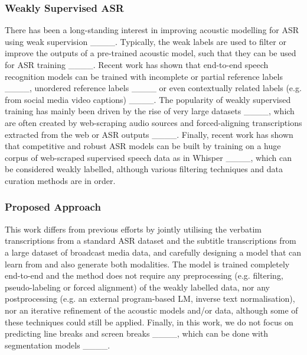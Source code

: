 \subsubsection{Weakly Supervised ASR}
\noindent There has been a long-standing interest in improving acoustic modelling for ASR using weak supervision ____. Typically, the weak labels are used to filter or improve the outputs of a pre-trained acoustic model, such that they can be used for ASR training ____. Recent work has shown that end-to-end speech recognition models can be trained with incomplete or partial reference labels ____, unordered reference labels ____ or even contextually related labels (e.g. from social media video captions) ____. The popularity of weakly supervised training has mainly been driven by the rise of very large datasets ____, which are often created by web-scraping audio sources and forced-aligning transcriptions extracted from the web or ASR outputs ____. Finally, recent work has shown that competitive and robust ASR models can be built by training on a huge corpus of web-scraped supervised speech data as in Whisper ____, which can be considered weakly labelled, although various filtering techniques and data curation methods are in order.

\subsubsection{Proposed Approach}
\noindent This work differs from previous efforts by jointly utilising the verbatim transcriptions from a standard ASR dataset and the subtitle transcriptions from a large dataset of broadcast media data, and carefully designing a model that can learn from and also generate both modalities. The model is trained completely end-to-end and the method does not require any preprocessing (e.g. filtering, pseudo-labeling or forced alignment) of the weakly labelled data, nor any postprocessing (e.g. an external program-based LM, inverse text normalisation), nor an iterative refinement of the acoustic models and/or data, although some of these techniques could still be applied. Finally, in this work, we do not focus on predicting line breaks and screen breaks ____, which can be done with segmentation models ____.